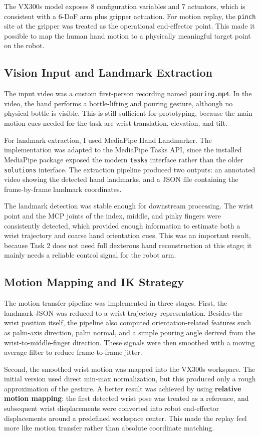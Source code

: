 \documentclass[11pt,a4paper]{article}
\begin{document}
The VX300s model exposes 8 configuration variables and 7 actuators, which is consistent with a 6-DoF arm plus gripper actuation. For motion replay, the \texttt{pinch} site at the gripper was treated as the operational end-effector point. This made it possible to map the human hand motion to a physically meaningful target point on the robot.

\subsection{Vision Input and Landmark Extraction}
The input video was a custom first-person recording named \texttt{pouring.mp4}. In the video, the hand performs a bottle-lifting and pouring gesture, although no physical bottle is visible. This is still sufficient for prototyping, because the main motion cues needed for the task are wrist translation, elevation, and tilt.

For landmark extraction, I used MediaPipe Hand Landmarker. The implementation was adapted to the MediaPipe Tasks API, since the installed MediaPipe package exposed the modern \texttt{tasks} interface rather than the older \texttt{solutions} interface. The extraction pipeline produced two outputs: an annotated video showing the detected hand landmarks, and a JSON file containing the frame-by-frame landmark coordinates.

The landmark detection was stable enough for downstream processing. The wrist point and the MCP joints of the index, middle, and pinky fingers were consistently detected, which provided enough information to estimate both a wrist trajectory and coarse hand orientation cues. This was an important result, because Task 2 does not need full dexterous hand reconstruction at this stage; it mainly needs a reliable control signal for the robot arm.

\subsection{Motion Mapping and IK Strategy}
The motion transfer pipeline was implemented in three stages. First, the landmark JSON was reduced to a wrist trajectory representation. Besides the wrist position itself, the pipeline also computed orientation-related features such as palm-axis direction, palm normal, and a simple pouring angle derived from the wrist-to-middle-finger direction. These signals were then smoothed with a moving average filter to reduce frame-to-frame jitter.

Second, the smoothed wrist motion was mapped into the VX300s workspace. The initial version used direct min-max normalization, but this produced only a rough approximation of the gesture. A better result was achieved by using \textbf{relative motion mapping}: the first detected wrist pose was treated as a reference, and subsequent wrist displacements were converted into robot end-effector displacements around a predefined workspace center. This made the replay feel more like motion transfer rather than absolute coordinate matching.
\end{document}
